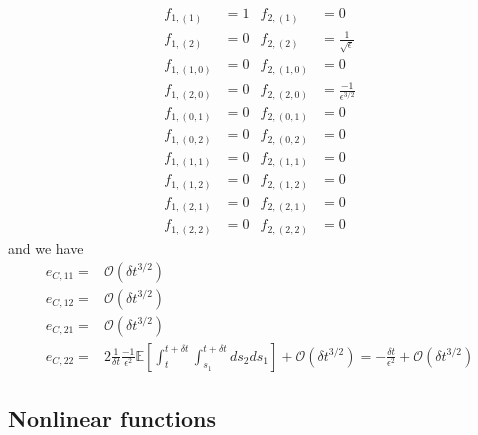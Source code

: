 \documentclass[12pt]{article}
\begin{document}
\begin{equation}
\begin{aligned}
f_{1,(1)} &= 1
&
f_{2,(1)} &= 0
\\
f_{1,(2)} &= 0
&
f_{2,(2)} &= \frac{1}{\sqrt{\epsilon}}
\\
f_{1,(1,0)} &= 0
&
f_{2,(1,0)} &= 0
\\
f_{1,(2,0)} &= 0
&
f_{2,(2,0)} &= \frac{-1}{\epsilon^{3/2}} 
\\
f_{1,(0,1)} &= 0
&
f_{2,(0,1)} &= 0
\\
f_{1,(0,2)} &= 0
&
f_{2,(0,2)} &= 0
\\
f_{1,(1,1)} &= 0
&
f_{2,(1,1)} &= 0
\\
f_{1,(1,2)} &= 0
&
f_{2,(1,2)} &= 0
\\
f_{1,(2,1)} &= 0
&
f_{2,(2,1)} &= 0
\\
f_{1,(2,2)} &= 0
&
f_{2,(2,2)} &= 0
\end{aligned}
\end{equation}
%
and we have
\begin{equation}
\begin{aligned}
e_{C, 11} =& \mathcal{O} (\delta t^{3/2}) \\
e_{C,12} =& \mathcal{O} (\delta t^{3/2}) \\
e_{C,21} =& \mathcal{O} (\delta t^{3/2}) \\
e_{C,22} =&
2 \frac{1}{\delta t}\frac{-1}{\epsilon^2} \mathbb{E} \left[ \int_t^{t+\delta t} \int_{s_1}^{t+\delta t} ds_2 ds_1 \right] + \mathcal{O} (\delta t^{3/2})
= - \frac{\delta t}{\epsilon^2} + \mathcal{O} (\delta t^{3/2})
\end{aligned}
\end{equation}

\subsection{Nonlinear functions}
\end{document}
